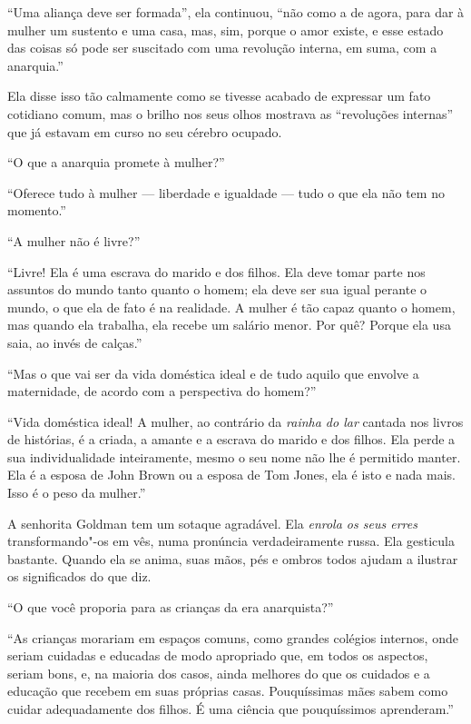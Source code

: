 ``Uma aliança deve ser formada'', ela continuou, ``não como a de agora,
para dar à mulher um sustento e uma casa, mas, sim, porque o amor
existe, e esse estado das coisas só pode ser suscitado com uma revolução
interna, em suma, com a anarquia.''

Ela disse isso tão calmamente como se tivesse acabado de expressar um
fato cotidiano comum, mas o brilho nos seus olhos mostrava as
``revoluções internas'' que já estavam em curso no seu cérebro ocupado.

``O que a anarquia promete à mulher?''

``Oferece tudo à mulher --- liberdade e igualdade --- tudo o que ela não
tem no momento.''

``A mulher não é livre?''

``Livre! Ela é uma escrava do marido e dos filhos. Ela deve tomar parte
nos assuntos do mundo tanto quanto o homem; ela deve ser sua igual
perante o mundo, o que ela de fato é na realidade. A mulher é tão capaz
quanto o homem, mas quando ela trabalha, ela recebe um salário menor.
Por quê? Porque ela usa saia, ao invés de calças.''

``Mas o que vai ser da vida doméstica ideal e de tudo aquilo que envolve
a maternidade, de acordo com a perspectiva do homem?''

``Vida doméstica ideal! A mulher, ao contrário da \textit{rainha do lar} cantada
nos livros de histórias, é a criada, a amante e a escrava do marido e dos
filhos. Ela perde a sua individualidade inteiramente, mesmo o seu nome
não lhe é permitido manter. Ela é a esposa de John Brown ou a esposa de
Tom Jones, ela é isto e nada mais. Isso é o peso da mulher.'' 

A senhorita Goldman tem um sotaque agradável. Ela \textit{enrola os seus erres}
transformando"-os em vês, numa pronúncia verdadeiramente russa. Ela
gesticula bastante. Quando ela se anima, suas mãos, pés e ombros todos
ajudam a ilustrar os significados do que diz.

``O que você proporia para as crianças da era anarquista?''

``As crianças morariam em espaços comuns, como grandes colégios
internos, onde seriam cuidadas e educadas de modo apropriado que, em
todos os aspectos, seriam bons, e, na maioria dos casos, ainda
melhores do que os cuidados e a educação que recebem em suas próprias
casas. Pouquíssimas mães sabem como cuidar adequadamente dos filhos. É
uma ciência que pouquíssimos aprenderam.''

